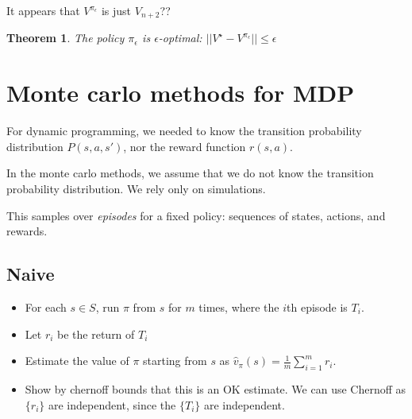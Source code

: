 \documentclass[11pt]{book}
\newcommand{\pieps}{{\pi_{\epsilon}}}
\newcommand{\Vn}{{V_{n}}}
\newcommand{\Vnnext}{{V_{n+1}}}
\newtheorem{theorem}{Theorem}
\newtheorem{proof}{Proof}
\begin{document}
It appears that $V^\pieps$ is just $V_{n+2}$??

\begin{theorem}
The policy $\pieps$ is $\epsilon$-optimal: $|| V^\star - V^\pieps|| \leq \epsilon$
\end{theorem}


\chapter{Monte carlo methods for MDP}

For dynamic programming, we needed to know the transition probability 
distribution $P(s, a, s')$, nor the reward function $r(s, a)$.

In the monte carlo methods, we assume that we do not know the transition 
probability distribution. We rely only on simulations.

This samples over \emph{episodes} for a fixed policy: sequences of states,
actions, and rewards.


\section{Naive}
\begin{itemize}
    \item For each $s \in S$, run $\pi$ from $s$ for $m$ times, where the $i$th episode is $T_i$.
    \item Let $r_i$ be the return of $T_i$
    \item Estimate the value of $\pi$ starting from $s$ as 
        ${\hat v_{\pi}(s) = \frac{1}{m} \sum_{i=1}^m r_i}$.
    \item Show by chernoff bounds that this is an OK estimate. We can use 
        Chernoff as ${ \{ r_i \} }$ are independent, 
        since the ${ \{ T_i \} }$ are independent.
\end{itemize}
\end{document}

